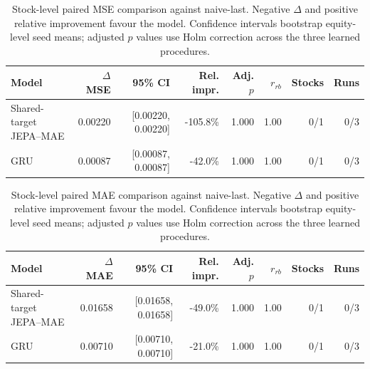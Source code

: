 \begin{table}[t]
\centering
\small
\caption{Stock-level paired MSE comparison against naive-last. Negative $\Delta$ and positive relative improvement favour the model. Confidence intervals bootstrap equity-level seed means; adjusted $p$ values use Holm correction across the three learned procedures.}
\label{tab:paired_mse_naive}
\begin{tabular}{lrrrrrrr}
\toprule
Model & $\Delta$MSE & 95\% CI & Rel. impr. & Adj. $p$ & $r_{rb}$ & Stocks & Runs \\
\midrule
Shared-target JEPA--MAE & 0.00220 & [0.00220, 0.00220] & -105.8\% & 1.000 & 1.00 & 0/1 & 0/3 \\
GRU & 0.00087 & [0.00087, 0.00087] & -42.0\% & 1.000 & 1.00 & 0/1 & 0/3 \\
\bottomrule
\end{tabular}
\end{table}

\begin{table}[t]
\centering
\small
\caption{Stock-level paired MAE comparison against naive-last. Negative $\Delta$ and positive relative improvement favour the model. Confidence intervals bootstrap equity-level seed means; adjusted $p$ values use Holm correction across the three learned procedures.}
\label{tab:paired_mae_naive}
\begin{tabular}{lrrrrrrr}
\toprule
Model & $\Delta$MAE & 95\% CI & Rel. impr. & Adj. $p$ & $r_{rb}$ & Stocks & Runs \\
\midrule
Shared-target JEPA--MAE & 0.01658 & [0.01658, 0.01658] & -49.0\% & 1.000 & 1.00 & 0/1 & 0/3 \\
GRU & 0.00710 & [0.00710, 0.00710] & -21.0\% & 1.000 & 1.00 & 0/1 & 0/3 \\
\bottomrule
\end{tabular}
\end{table}
